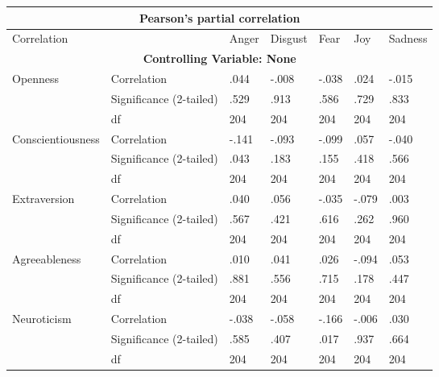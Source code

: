 \documentclass{llncs}
\begin{document}
\begin{table}[!ht]
\centering
\begin{tabular}{@{}lllllll@{}}
\toprule
\multicolumn{7}{c}{\textbf{Pearson's partial correlation}}                              \\ \midrule
Correlation       &                         & Anger & Disgust & Fear  & Joy   & Sadness \\
\multicolumn{7}{c}{\textbf{Controlling Variable: None}}                                 \\
Openness          & Correlation             & .044  & -.008   & -.038 & .024  & -.015   \\
                  & Significance (2-tailed) & .529  & .913    & .586  & .729  & .833    \\
                  & df                      & 204   & 204     & 204   & 204   & 204     \\
Conscientiousness & Correlation             & -.141 & -.093   & -.099 & .057  & -.040   \\
                  & Significance (2-tailed) & .043  & .183    & .155  & .418  & .566    \\
                  & df                      & 204   & 204     & 204   & 204   & 204     \\
Extraversion      & Correlation             & .040  & .056    & -.035 & -.079 & .003    \\
                  & Significance (2-tailed) & .567  & .421    & .616  & .262  & .960    \\
                  & df                      & 204   & 204     & 204   & 204   & 204     \\
Agreeableness     & Correlation             & .010  & .041    & .026  & -.094 & .053    \\
                  & Significance (2-tailed) & .881  & .556    & .715  & .178  & .447    \\
                  & df                      & 204   & 204     & 204   & 204   & 204     \\
Neuroticism       & Correlation             & -.038 & -.058   & -.166 & -.006 & .030    \\
                  & Significance (2-tailed) & .585  & .407    & .017  & .937  & .664    \\
                  & df                      & 204   & 204     & 204   & 204   & 204     \\

\end{tabular}
\end{table}
\end{document}
